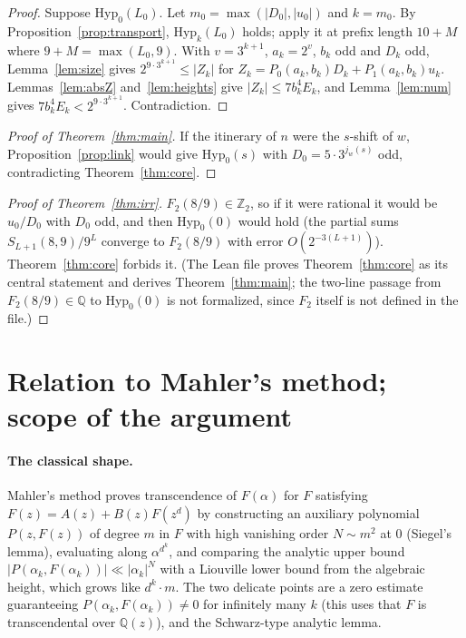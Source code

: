 \documentclass[11pt]{article}
\theoremstyle{definition}
\newcommand{\Z}{\mathbb{Z}}
\newcommand{\Q}{\mathbb{Q}}
\begin{document}
\begin{proof}
Suppose $\mathrm{Hyp}_0(L_0)$. Let $m_0 = \max(|D_0|,|u_0|)$ and $k =
m_0$. By Proposition~\ref{prop:transport}, $\mathrm{Hyp}_k(L_0)$ holds;
apply it at prefix length $10 + M$ where $9 + M = \max(L_0, 9)$. With
$v = 3^{k+1}$, $a_k = 2^v$, $b_k$ odd and $D_k$ odd,
Lemma~\ref{lem:size} gives $2^{9 \cdot 3^{k+1}} \le |Z_k|$ for $Z_k =
P_0(a_k,b_k) D_k + P_1(a_k,b_k) u_k$. Lemmas~\ref{lem:absZ}
and~\ref{lem:heights} give $|Z_k| \le 7 b_k^4 E_k$, and
Lemma~\ref{lem:num} gives $7 b_k^4 E_k < 2^{9 \cdot 3^{k+1}}$.
Contradiction.
\end{proof}

\begin{proof}[Proof of Theorem~\ref{thm:main}]
If the itinerary of $n$ were the $s$-shift of $w$,
Proposition~\ref{prop:link} would give $\mathrm{Hyp}_0(s)$ with $D_0 =
5 \cdot 3^{j_w(s)}$ odd, contradicting Theorem~\ref{thm:core}.
\end{proof}

\begin{proof}[Proof of Theorem~\ref{thm:irr}]
$F_2(8/9) \in \Z_2$, so if it were rational it would be $u_0/D_0$ with
$D_0$ odd, and then $\mathrm{Hyp}_0(0)$ would hold (the partial sums
$S_{L+1}(8,9)/9^L$ converge to $F_2(8/9)$ with error $O(2^{-3(L+1)})$).
Theorem~\ref{thm:core} forbids it. (The Lean file proves
Theorem~\ref{thm:core} as its central statement and derives
Theorem~\ref{thm:main}; the two-line passage from $F_2(8/9) \in \Q$ to
$\mathrm{Hyp}_0(0)$ is not formalized, since $F_2$ itself is not
defined in the file.)
\end{proof}

\section{Relation to Mahler's method; scope of the argument}
\label{sec:classical}

\paragraph{The classical shape.} Mahler's method \cite{mahler,
nishioka} proves transcendence of $F(\alpha)$ for $F$ satisfying
$F(z) = A(z) + B(z)F(z^d)$ by constructing an auxiliary polynomial
$P(z, F(z))$ of degree $m$ in $F$ with high vanishing order $N \sim
m^2$ at $0$ (Siegel's lemma), evaluating along $\alpha^{d^k}$, and
comparing the analytic upper bound $|P(\alpha_k, F(\alpha_k))| \ll
|\alpha_k|^N$ with a Liouville lower bound from the algebraic height,
which grows like $d^k \cdot m$. The two delicate points are a zero
estimate guaranteeing $P(\alpha_k, F(\alpha_k)) \ne 0$ for infinitely
many $k$ (this uses that $F$ is transcendental over $\Q(z)$), and the
Schwarz-type analytic lemma.
\end{document}
